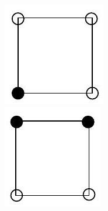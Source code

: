 \documentclass[10pt]{article}
\begin{document}
\includegraphics[max width=\textwidth, center]{2025_09_05_3ba26226ec0baddb5a03g-56(3)}\\
\includegraphics[max width=\textwidth, center]{2025_09_05_3ba26226ec0baddb5a03g-56(4)}\\
\end{document}
